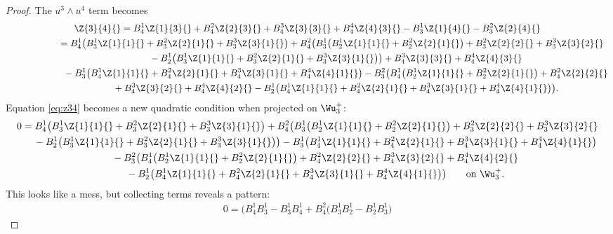 \begin{proof}
The $u^3 \wedge u^4$ term becomes
\begin{gather}
\Z{3}{4}{}
=
 B^{1}_{4}\Z{1}{3}{} + B^{2}_{4}\Z{2}{3}{} +
 B^{3}_{4}\Z{3}{3}{} + B^{4}_{4}\Z{4}{3}{} -
 B^{1}_{3}\Z{1}{4}{} - B^{2}_{3}\Z{2}{4}{}\nonumber\\
\hphantom{\Z{3}{4}{}}{}
=
 B^{1}_{4}\big( B^{1}_{3}\Z{1}{1}{} + B^{2}_{3}\Z{2}{1}{}
 + B^{3}_{3}\Z{3}{1}{}\big)
+ B^{2}_{4}\big( B^{1}_{3}\big( B^{1}_{2}\Z{1}{1}{} +
B^{2}_{2}\Z{2}{1}{}\big) + B^{2}_{3}\Z{2}{2}{} +
B^{3}_{3}\Z{3}{2}{}\nonumber\\
\hphantom{\Z{3}{4}{}=}{}
- B^{1}_{2}\big( B^{1}_{3}\Z{1}{1}{} +
B^{2}_{3}\Z{2}{1}{} + B^{3}_{3}\Z{3}{1}{}\big)\big)
 + B^{3}_{4}\Z{3}{3}{} + B^{4}_{4}\Z{4}{3}{} \nonumber\\
\hphantom{\Z{3}{4}{}=}{}
- B^{1}_{3}\big( B^{1}_{4}\Z{1}{1}{} +
B^{2}_{4}\Z{2}{1}{} + B^{3}_{4}\Z{3}{1}{} +
B^{4}_{4}\Z{4}{1}{}\big)- B^{2}_{3}\big( B^{1}_{4}\big( B^{1}_{2}\Z{1}{1}{} +
B^{2}_{2}\Z{2}{1}{}\big) + B^{2}_{4}\Z{2}{2}{}\nonumber\\
\hphantom{\Z{3}{4}{}=}{}
+
B^{3}_{4}\Z{3}{2}{} + B^{4}_{4}\Z{4}{2}{}
 -  B^{1}_{2}\big( B^{1}_{4}\Z{1}{1}{} +
B^{2}_{4}\Z{2}{1}{} + B^{3}_{4}\Z{3}{1}{} + B^{4}_{4}\Z{4}{1}{}\big)\big).
\label{eq:z34}
\end{gather}
Equation \eqref{eq:z34} becomes a new quadratic condition when projected on
$\Wu^+_3$:
\begin{gather*}
0 =
B^{1}_{4}\big( B^{1}_{3}\Z{1}{1}{} + B^{2}_{3}\Z{2}{1}{}
 + B^{3}_{3}\Z{3}{1}{}\big)
+ B^{2}_{4}\big( B^{1}_{3}\big( B^{1}_{2}\Z{1}{1}{} +
B^{2}_{2}\Z{2}{1}{}\big) + B^{2}_{3}\Z{2}{2}{} +
B^{3}_{3}\Z{3}{2}{} \\
\hphantom{0=}{}
  - B^{1}_{2}\big( B^{1}_{3}\Z{1}{1}{} +
B^{2}_{3}\Z{2}{1}{} + B^{3}_{3}\Z{3}{1}{}\big)\big)
 - B^{1}_{3}\big( B^{1}_{4}\Z{1}{1}{} +
B^{2}_{4}\Z{2}{1}{} + B^{3}_{4}\Z{3}{1}{} +
B^{4}_{4}\Z{4}{1}{}\big)\\
\hphantom{0=}{}
- B^{2}_{3}\big( B^{1}_{4}\big( B^{1}_{2}\Z{1}{1}{} +
B^{2}_{2}\Z{2}{1}{}\big) + B^{2}_{4}\Z{2}{2}{} +
B^{3}_{4}\Z{3}{2}{} + B^{4}_{4}\Z{4}{2}{}  \\
\hphantom{0=}{}
 -  B^{1}_{2}\big( B^{1}_{4}\Z{1}{1}{} +
B^{2}_{4}\Z{2}{1}{} + B^{3}_{4}\Z{3}{1}{} + B^{4}_{4}\Z{4}{1}{}\big)\big) \qquad \text{on
$\Wu^+_3$}.
\end{gather*}
This looks like a mess, but collecting terms reveals a pattern:
\begin{gather*}
0=
\big( B^{1}_{4}B^{1}_{3} - B^{1}_{3}B^{1}_{4}
+ B^{2}_{4}\big( B^{1}_{3}B^{1}_{2} - B^{1}_{2}B^{1}_{3}\big)

\end{gather*}
\end{proof}
